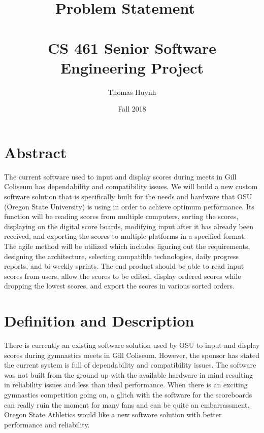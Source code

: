 \documentclass[a4paper, 10pt,draftclsnofoot,onecolumn]{article}\usepackage[letterpaper,margin=0.75in]
\title{Problem Statement
\ \\
\ \\
CS 461 Senior Software Engineering Project
}
\author{Thomas Huynh}
\date{Fall 2018}
\begin{document}
\maketitle
\section{ Abstract}
The current software used to input and display scores during meets in Gill Coliseum has dependability and compatibility issues. We will build  a new custom software solution that is specifically built for the needs and hardware that OSU (Oregon State University) is using in order to achieve optimum performance. Its function will be reading scores from multiple computers, sorting the scores, displaying on the digital score boards, modifying input after it has already been received, and exporting the scores to multiple platforms in a specified format. The agile method will be utilized which includes figuring out the requirements, designing the architecture, selecting compatible technologies, daily progress reports, and bi-weekly sprints. The end product should be able to read input scores from users, allow the scores to be edited, display ordered scores while dropping the lowest scores, and export the scores in various sorted orders.


\newpage
\section{Definition and Description}
There is currently an existing software solution used by OSU to input and display scores during gymnastics meets in Gill Coliseum. However, the sponsor has stated the current system is full of dependability and compatibility issues. The software was not built from the ground up with the available hardware in mind resulting in reliability issues and less than ideal performance. When there is an exciting gymnastics competition going on, a glitch with the software for the scoreboards can really ruin the moment for many fans and can be quite an embarrassment. Oregon State Athletics would like a new software solution with better performance and reliability.
\end{document}
